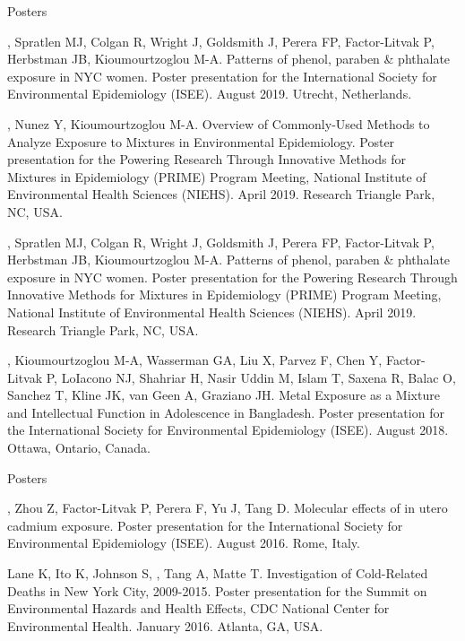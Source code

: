 \documentclass[a4paper,10pt]{article}
\newlength{\cvcolumngapwidth}
\newlength{\cvleftcolumnwidth}
\newlength{\cvrightcolumnwidth}
\newcommand{\cvdurationstyle}[1]{{\small\cvdurationfont\textcolor{cvdurationcolor}{#1}}}
\newlength{\cvafteritemskipamount}
\newlength{\cvparskip}
\newcommand{\cvitem}[2]{
    \begin{minipage}[t]{\cvleftcolumnwidth}
        \raggedleft #1
    \end{minipage}%
    \hspace{\cvcolumngapwidth}%
    \begin{minipage}[t]{\cvrightcolumnwidth}
        \setlength{\parskip}{\cvparskip} #2
    \end{minipage}

    \vspace{\cvafteritemskipamount}
}
\begin{document}
\cvitem{
    \cvdurationstyle{Posters}
}{  
    \begin{etaremune}
    \setcounter{enumi}{7}
   	 \item {\cvnamefont{Gibson EA}}, Spratlen MJ, Colgan R, Wright J, Goldsmith J, Perera FP, Factor-Litvak P, Herbstman JB, Kioumourtzoglou M-A. Patterns of phenol, paraben \& phthalate exposure in NYC women. Poster presentation for the International Society for Environmental Epidemiology (ISEE). August 2019. Utrecht, Netherlands. 
	\item {\cvnamefont{Gibson EA}}, Nunez Y, Kioumourtzoglou M-A. Overview of Commonly-Used Methods to Analyze Exposure to Mixtures in Environmental Epidemiology. Poster presentation for the Powering Research Through Innovative Methods for Mixtures in Epidemiology (PRIME) Program Meeting, National Institute of Environmental Health Sciences (NIEHS). April 2019. Research Triangle Park, NC, USA. 
	\item {\cvnamefont{Gibson EA}}, Spratlen MJ, Colgan R, Wright J, Goldsmith J, Perera FP, Factor-Litvak P, Herbstman JB, Kioumourtzoglou M-A. Patterns of phenol, paraben \& phthalate exposure in NYC women. Poster presentation for the Powering Research Through Innovative Methods for Mixtures in Epidemiology (PRIME) Program Meeting, National Institute of Environmental Health Sciences (NIEHS). April 2019. Research Triangle Park, NC, USA. 
    	\item {\cvnamefont{Gibson EA}}, Kioumourtzoglou M-A, Wasserman GA, Liu X, Parvez F, Chen Y, Factor-Litvak P, LoIacono NJ, Shahriar H, Nasir Uddin M, Islam T, Saxena R, Balac O, Sanchez T, Kline JK, van Geen A, Graziano JH. Metal Exposure as a Mixture and Intellectual Function in Adolescence in Bangladesh. Poster presentation for the International Society for Environmental Epidemiology (ISEE). August 2018. Ottawa, Ontario, Canada.
    \end{etaremune}
}
\cvitem{
    \cvdurationstyle{Posters}
}{  
    \begin{etaremune}
    \setcounter{enumi}{3}
	\item {\cvnamefont{Gibson EA}}, Zhou Z, Factor-Litvak P, Perera F, Yu J, Tang D. Molecular effects of in utero cadmium exposure. Poster presentation for the International Society for Environmental Epidemiology (ISEE). August 2016. Rome, Italy. 
	\item Lane K, Ito K, Johnson S, {\cvnamefont{Gibson EA}}, Tang A, Matte T. Investigation of Cold-Related Deaths in New York City, 2009-2015. Poster presentation for the Summit on Environmental Hazards and Health Effects, CDC National Center for Environmental Health. January 2016. Atlanta, GA, USA. \\
    \end{etaremune}

}
\end{document}

